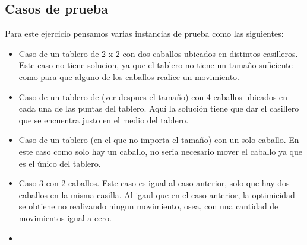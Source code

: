 \subsection{Casos de prueba}

Para este ejercicio pensamos varias instancias de prueba como las siguientes:

\begin{itemize}
\item Caso de un tablero de 2 x 2 con dos caballos ubicados en distintos casilleros. Este caso no tiene solucion, ya que el tablero no tiene un tamaño suficiente como para que alguno de los caballos realice un movimiento.
\item Caso de un tablero de (ver despues el tamaño) con 4 caballos ubicados en cada una de las puntas del tablero. Aquí la solución tiene que dar el casillero que se encuentra justo en el medio del tablero.
\item Caso de un tablero (en el que no importa el tamaño) con un solo caballo. En este caso como solo hay un caballo, no seria necesario mover el caballo ya que es el único del tablero.
\item Caso 3 con 2 caballos. Este caso es igual al caso anterior, solo que hay dos caballos en la misma casilla. Al igaul que en el caso anterior, la optimicidad se obtiene no realizando ningun movimiento, osea, con una cantidad de movimientos igual a cero.
\item
\end{itemize}